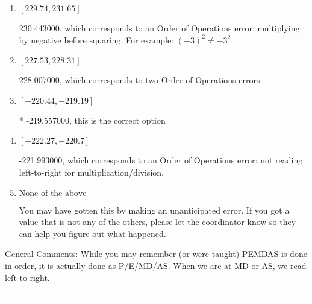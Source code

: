 \documentclass{extbook}[14pt]
\begin{document}
\begin{enumerate}[label=\Alph*.] 
\item $ [229.74, 231.65] $ 

  230.443000, which corresponds to an Order of Operations error: multiplying by negative before squaring. For example: $(-3)^2 \neq -3^2$ 
\item $ [227.53, 228.31] $ 

  228.007000, which corresponds to two Order of Operations errors. 
\item $ [-220.44, -219.19] $ 

 * -219.557000, this is the correct option 
\item $ [-222.27, -220.7] $ 

  -221.993000, which corresponds to an Order of Operations error: not reading left-to-right for multiplication/division. 
\item $ \text{None of the above} $ 

  You may have gotten this by making an unanticipated error. If you got a value that is not any of the others, please let the coordinator know so they can help you figure out what happened. 
\end{enumerate} 
 
General Comments: While you may remember (or were taught) PEMDAS is done in order, it is actually done as P/E/MD/AS. When we are at MD or AS, we read left to right.

-----------------------------------------------
\end{document}
